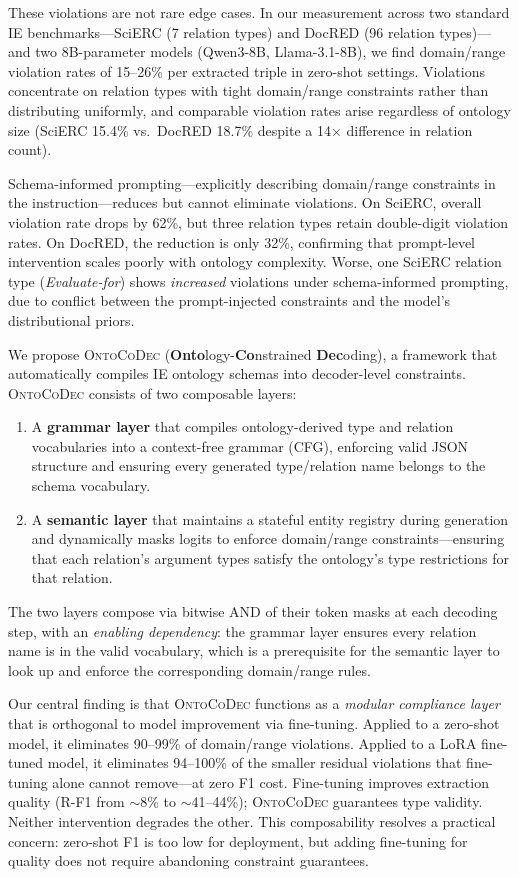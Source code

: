 \documentclass[11pt,a4paper]{article}
\newcommand{\sys}{\textsc{OntoCoDec}}
\begin{document}
These violations are not rare edge cases. In our measurement across two standard IE benchmarks---SciERC (7 relation types) and DocRED (96 relation types)---and two 8B-parameter models (Qwen3-8B, Llama-3.1-8B), we find domain/range violation rates of 15--26\% per extracted triple in zero-shot settings. Violations concentrate on relation types with tight domain/range constraints rather than distributing uniformly, and comparable violation rates arise regardless of ontology size (SciERC 15.4\% vs.\ DocRED 18.7\% despite a 14$\times$ difference in relation count).

Schema-informed prompting---explicitly describing domain/range constraints in the instruction---reduces but cannot eliminate violations. On SciERC, overall violation rate drops by 62\%, but three relation types retain double-digit violation rates. On DocRED, the reduction is only 32\%, confirming that prompt-level intervention scales poorly with ontology complexity. Worse, one SciERC relation type (\emph{Evaluate-for}) shows \emph{increased} violations under schema-informed prompting, due to conflict between the prompt-injected constraints and the model's distributional priors.

We propose \sys{} (\textbf{Onto}logy-\textbf{Co}nstrained \textbf{Dec}oding), a framework that automatically compiles IE ontology schemas into decoder-level constraints. \sys{} consists of two composable layers:
\begin{enumerate}[nosep,leftmargin=*]
    \item A \textbf{grammar layer} that compiles ontology-derived type and relation vocabularies into a context-free grammar (CFG), enforcing valid JSON structure and ensuring every generated type/relation name belongs to the schema vocabulary.
    \item A \textbf{semantic layer} that maintains a stateful entity registry during generation and dynamically masks logits to enforce domain/range constraints---ensuring that each relation's argument types satisfy the ontology's type restrictions for that relation.
\end{enumerate}
The two layers compose via bitwise AND of their token masks at each decoding step, with an \emph{enabling dependency}: the grammar layer ensures every relation name is in the valid vocabulary, which is a prerequisite for the semantic layer to look up and enforce the corresponding domain/range rules.

Our central finding is that \sys{} functions as a \emph{modular compliance layer} that is orthogonal to model improvement via fine-tuning. Applied to a zero-shot model, it eliminates 90--99\% of domain/range violations. Applied to a LoRA fine-tuned model, it eliminates 94--100\% of the smaller residual violations that fine-tuning alone cannot remove---at zero F1 cost. Fine-tuning improves extraction quality (R-F1 from $\sim$8\% to $\sim$41--44\%); \sys{} guarantees type validity. Neither intervention degrades the other. This composability resolves a practical concern: zero-shot F1 is too low for deployment, but adding fine-tuning for quality does not require abandoning constraint guarantees.
\end{document}
